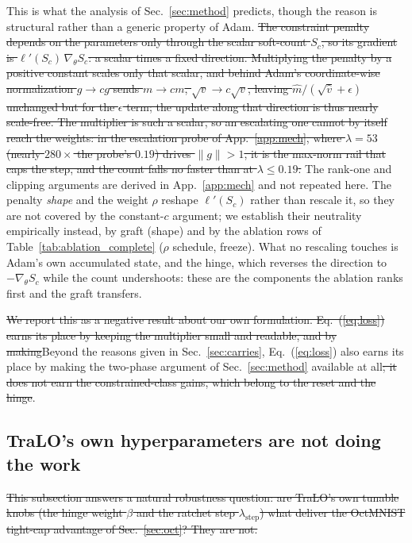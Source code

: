 \documentclass[10pt]{article}
\newcommand{\del}[1]{{\color{red}\sout{#1}}}
\begin{document}
This is what the analysis of Sec.~\ref{sec:method} predicts, though the
reason is structural rather than a generic property of Adam. \del{The
constraint penalty depends on the parameters only through the scalar
soft-count $S_c$, so its gradient is $\ell'(S_c)\,\nabla_\theta S_c$: a
scalar times a fixed direction. Multiplying the penalty by a positive
constant scales only that scalar, and behind Adam's coordinate-wise
normalization $g\!\to\!cg$ sends $m\!\to\!cm$, $\sqrt{v}\!\to\!c\sqrt{v}$,
leaving $\hat m/(\sqrt{\hat v}+\epsilon)$ unchanged but for the
$\epsilon$ term; the update along that direction is thus nearly
scale-free. The multiplier is such a scalar, so an escalating one
cannot by itself reach the weights: in the escalation probe of
App.~\ref{app:mech}, where $\lambda{=}53$ (nearly $280\times$ the
probe's $0.19$) drives $\|g\|{>}1$, it is the max-norm rail that caps
the step, and the count falls no faster than at $\lambda\!\le\!0.19$.}%
{\color{blue}The rank-one and clipping arguments are derived in
App.~\ref{app:mech} and not repeated here.}
The penalty \emph{shape} and the weight $\rho$ reshape $\ell'(S_c)$
rather than rescale it, so they are not covered by the constant-$c$
argument; we establish their neutrality empirically instead, by graft
(shape) and by the ablation rows of Table~\ref{tab:ablation_complete}
($\rho$ schedule, freeze). What no rescaling touches is Adam's own
accumulated state, and the hinge, which reverses the direction to
$-\nabla_\theta S_c$ while the count undershoots: these are the
components the ablation ranks first and the graft transfers.

\del{We report this as a negative result about our own formulation.
Eq.~(\ref{eq:loss}) earns its place by keeping the multiplier small and
readable, and by making}{\color{blue}Beyond the reasons given in
Sec.~\ref{sec:carries}, Eq.~(\ref{eq:loss}) also earns its place by making} the two-phase argument of Sec.~\ref{sec:method}
available at all\del{; it does not earn the constrained-class gains, which
belong to the reset and the hinge}.

\subsection{TraLO's own hyperparameters are not doing the work}
\label{app:tralo-sweep}

\del{This subsection answers a natural robustness question: are TraLO's own
tunable knobs (the hinge weight $\beta$ and the ratchet step
$\lambda_{\text{step}}$) what deliver the OctMNIST tight-cap advantage
of Sec.~\ref{sec:oct}? They are not.}
\end{document}
